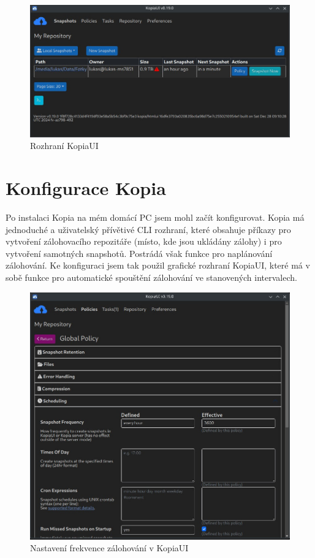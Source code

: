 \documentclass[a4paper,12pt, oneside]{book}
\begin{document}
\begin{figure}[h]
\centering
\includegraphics[width=1\textwidth]{img/kopiaUI-Snapshots.jpg}
\caption{Rozhraní KopiaUI}
\end{figure}


\section{Konfigurace Kopia}

Po instalaci Kopia na mém domácí PC jsem mohl začít
konfigurovat. Kopia má jednoduché a uživatelský přívětivé CLI rozhraní, které
obsahuje příkazy pro vytvoření zálohovacího repozitáře (místo, kde jsou ukládány
zálohy) i pro vytvoření samotných snapshotů. Postrádá však funkce pro
naplánování zálohování. Ke konfiguraci jsem tak použil grafické rozhraní
KopiaUI, které má v sobě funkce pro automatické spouštění zálohování ve
stanovených intervalech. 

\begin{figure}[h]
\centering
\includegraphics[width=1\textwidth]{img/kopiaUI-Policy.jpg}
\caption{Nastavení frekvence zálohování v KopiaUI}
\end{figure}
\end{document}
